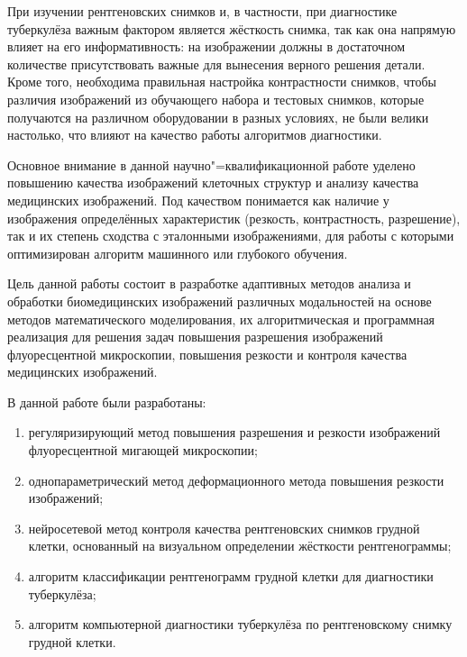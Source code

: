 При изучении рентгеновских снимков и, в частности, при диагностике туберкулёза важным фактором является жёсткость снимка, так как она напрямую влияет на его информативность: на изображении должны в достаточном количестве присутствовать важные для вынесения верного решения детали. Кроме того, необходима правильная настройка контрастности снимков, чтобы различия изображений из обучающего набора и тестовых снимков, которые получаются на различном оборудовании в разных условиях, не были велики настолько, что влияют на качество работы алгоритмов диагностики.

Основное внимание в данной научно"=квалификационной работе уделено повышению качества изображений клеточных структур и анализу качества медицинских изображений. Под качеством понимается как наличие у изображения определённых характеристик (резкость, контрастность, разрешение), так и их степень сходства с эталонными изображениями, для работы с которыми оптимизирован алгоритм машинного или глубокого обучения.


{\aim}

Цель данной работы состоит в разработке адаптивных методов анализа и обработки биомедицинских изображений различных модальностей на основе методов математического моделирования, их алгоритмическая и программная реализация для решения задач повышения разрешения изображений флуоресцентной микроскопии, повышения резкости и контроля качества медицинских изображений.


{\novelty}

В данной работе были разработаны:

\begin{enumerate}[beginpenalty=10000]
 	\item регуляризирующий метод повышения разрешения и резкости изображений флуоресцентной мигающей микроскопии;

	\item однопараметрический метод деформационного метода повышения резкости изображений;

	\item нейросетевой метод контроля качества рентгеновских снимков грудной клетки, основанный на визуальном определении жёсткости рентгенограммы;

	\item алгоритм классификации рентгенограмм грудной клетки для диагностики туберкулёза;
	
	\item алгоритм компьютерной диагностики туберкулёза по рентгеновскому снимку грудной клетки.
\end{enumerate}

